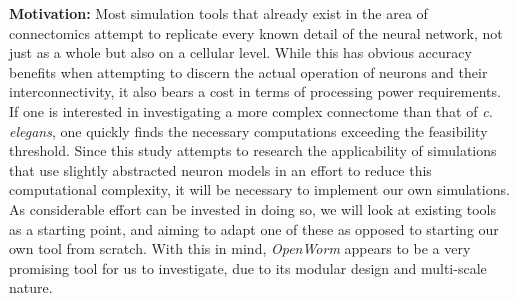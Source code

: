 \documentclass[a4paper,11pt]{article}
\begin{document}

\textbf{Motivation:}
Most simulation tools that already exist in the area of connectomics attempt to replicate every known detail of the neural network, not just as a whole but also on a cellular level. While this has obvious accuracy benefits when attempting to discern the actual operation of neurons and their interconnectivity, it also bears a cost in terms of processing power requirements. If one is interested in investigating a more complex connectome than that of \emph{c. elegans}, one quickly finds the necessary computations exceeding the feasibility threshold.
Since this study attempts to research the applicability of simulations that use slightly abstracted neuron models in an effort to reduce this computational complexity, it will be necessary to implement our own simulations. As considerable effort can be invested in doing so, we will look at existing tools as a starting point, and aiming to adapt one of these as opposed to starting our own tool from scratch. With this in mind, \emph{OpenWorm} \citep{Szigeti2014} appears to be a very promising tool for us to investigate, due to its modular design and multi-scale nature.
\end{document}
